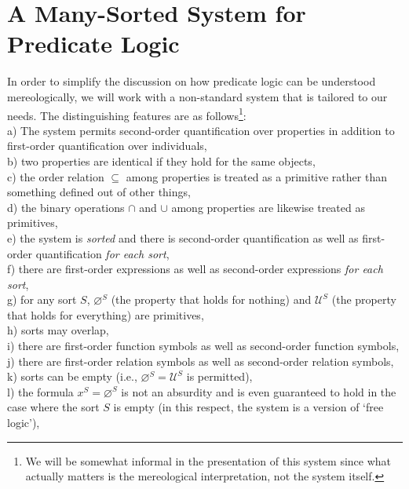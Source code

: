 \documentclass[12pt]{book}
\begin{document}
\section{A Many-Sorted System for Predicate Logic} \label{system_for_predicate_logic}
In order to simplify the discussion on how predicate logic can be understood mereologically, we will work with a non-standard system that is tailored to our needs. The distinguishing features are as follows\footnote{We will be somewhat informal in the presentation of this system since what actually matters is the mereological interpretation, not the system itself.}:\\
a) The system permits second-order quantification over properties in addition to first-order quantification over individuals,\\
b) two properties are identical if they hold for the same objects,\\
c) the order relation $\subseteq$ among properties is treated as a primitive rather than something defined out of other things,\\
d) the binary operations $\cap$ and $\cup$ among properties are likewise treated as primitives,\\
e) the system is \textit{sorted} and there is second-order quantification as well as first-order quantification \textit{for each sort},\\
f) there are first-order expressions as well as second-order expressions \textit{for each sort},\\
g) for any sort $S$, $\varnothing^S$ (the property that holds for nothing) and $\mathcal{U}^S$ (the property that holds for everything) are primitives,\\
h) sorts may overlap,\\
i) there are first-order function symbols as well as second-order function symbols,\\
j) there are first-order relation symbols as well as second-order relation symbols,\\
k) sorts can be empty (i.e., $\varnothing^S = \mathcal{U}^S$ is permitted),\\
l) the formula $x^S = \varnothing^S$ is not an absurdity and is even guaranteed to hold in the case where the sort $S$ is empty (in this respect, the system is a version of `free logic'),\\
\end{document}
